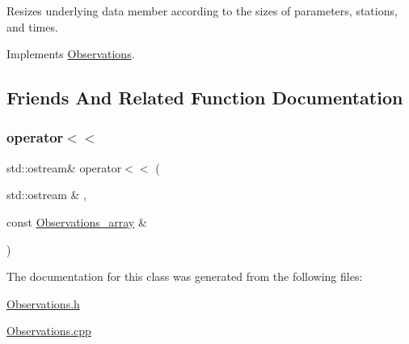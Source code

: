 Resizes underlying data member according to the sizes of parameters, stations, and times. 

Implements \mbox{\hyperlink{class_observations_aab0540879c2d3fdf5f91d30ea2f902fd}{Observations}}.



\subsection{Friends And Related Function Documentation}
\mbox{\label{class_observations__array_affb01c6a2af2ae2b833f7edec435234d}} 
\subsubsection{\texorpdfstring{operator$<$$<$}{operator<<}}
{\footnotesize\ttfamily std\+::ostream\& operator$<$$<$ (\begin{DoxyParamCaption}\item[{std\+::ostream \&}]{,  }\item[{const \mbox{\hyperlink{class_observations__array}{Observations\+\_\+array}} \&}]{ }\end{DoxyParamCaption})\hspace{0.3cm}{\ttfamily [friend]}}



The documentation for this class was generated from the following files\+:\begin{DoxyCompactItemize}
\item 
\mbox{\hyperlink{_observations_8h}{Observations.\+h}}\item 
\mbox{\hyperlink{_observations_8cpp}{Observations.\+cpp}}\end{DoxyCompactItemize}
